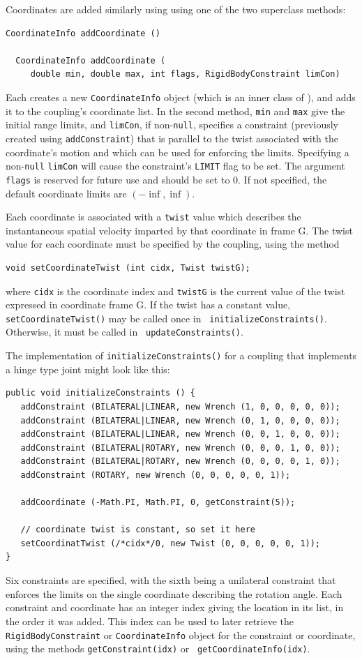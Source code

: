 Coordinates are added similarly using using one of the two superclass
methods:
\begin{lstlisting}[]
  CoordinateInfo addCoordinate ()

  CoordinateInfo addCoordinate (
     double min, double max, int flags, RigidBodyConstraint limCon)
\end{lstlisting}
%
Each creates a new {\tt CoordinateInfo} object (which is an inner class
of ), and adds it to the
coupling's coordinate list. In the second method, {\tt min} and {\tt max} give
the initial range limits, and {\tt limCon}, if non-{\tt null}, specifies a
constraint (previously created using {\tt addConstraint}) that is parallel to
the twist associated with the coordinate's motion and which can be used for
enforcing the limits. Specifying a non-{\tt null} {\tt limCon} will cause the
constraint's {\tt LIMIT} flag to be set.  The argument {\tt flags} is reserved
for future use and should be set to 0. If not specified, the default coordinate
limits are $(-\inf, \inf)$.

Each coordinate is associated with a {\tt twist} value which describes the
instantaneous spatial velocity imparted by that coordinate in frame G.  The
twist value for each coordinate must be specified by the coupling, using the
method
\begin{lstlisting}[]
  void setCoordinateTwist (int cidx, Twist twistG);
\end{lstlisting}
where {\tt cidx} is the coordinate index and {\tt twistG} is the current value
of the twist expressed in coordinate frame G.  If the twist has a constant
value, {\tt setCoordinateTwist()} may be called once in {\tt
initializeConstraints()}. Otherwise, it must be called in {\tt
updateConstraints()}.

The implementation of {\tt initializeConstraints()} for a coupling
that implements a hinge type joint might look like this:
%
\begin{lstlisting}[]
public void initializeConstraints () {
   addConstraint (BILATERAL|LINEAR, new Wrench (1, 0, 0, 0, 0, 0));
   addConstraint (BILATERAL|LINEAR, new Wrench (0, 1, 0, 0, 0, 0));
   addConstraint (BILATERAL|LINEAR, new Wrench (0, 0, 1, 0, 0, 0));
   addConstraint (BILATERAL|ROTARY, new Wrench (0, 0, 0, 1, 0, 0));
   addConstraint (BILATERAL|ROTARY, new Wrench (0, 0, 0, 0, 1, 0));
   addConstraint (ROTARY, new Wrench (0, 0, 0, 0, 0, 1));

   addCoordinate (-Math.PI, Math.PI, 0, getConstraint(5));

   // coordinate twist is constant, so set it here
   setCoordinatTwist (/*cidx*/0, new Twist (0, 0, 0, 0, 0, 1));
}
\end{lstlisting}
%
Six constraints are specified, with the sixth being a unilateral
constraint that enforces the limits on the single coordinate
describing the rotation angle.  Each constraint and coordinate has an
integer index giving the location in its list, in the order it was
added. This index can be used to later retrieve the {\tt
RigidBodyConstraint} or {\tt CoordinateInfo} object for the constraint
or coordinate, using the methods {\tt getConstraint(idx)} or {\tt
getCoordinateInfo(idx)}.

